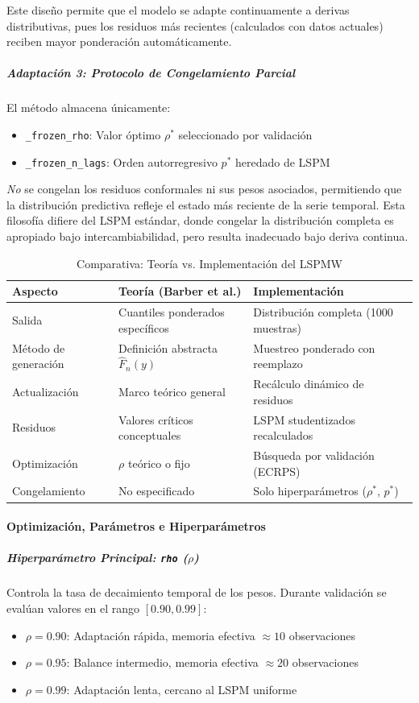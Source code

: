 Este diseño permite que el modelo se adapte continuamente a derivas distributivas, pues los residuos más recientes (calculados con datos actuales) reciben mayor ponderación automáticamente.

\subparagraph{Adaptación 3: Protocolo de Congelamiento Parcial}
El método almacena únicamente:
\begin{itemize}
    \item \texttt{\_frozen\_rho}: Valor óptimo $\rho^*$ seleccionado por validación
    \item \texttt{\_frozen\_n\_lags}: Orden autorregresivo $p^*$ heredado de LSPM
\end{itemize}

\textit{No} se congelan los residuos conformales ni sus pesos asociados, permitiendo que la distribución predictiva refleje el estado más reciente de la serie temporal. Esta filosofía difiere del LSPM estándar, donde congelar la distribución completa es apropiado bajo intercambiabilidad, pero resulta inadecuado bajo deriva continua.

\begin{table}[htbp]
\centering
\caption{Comparativa: Teoría vs. Implementación del LSPMW}
\begin{tabular}{lll}
\toprule
\textbf{Aspecto} & \textbf{Teoría (Barber et al.)} & \textbf{Implementación} \\
\midrule
Salida & Cuantiles ponderados específicos & Distribución completa (1000 muestras) \\
Método de generación & Definición abstracta $\hat{F}_n(y)$ & Muestreo ponderado con reemplazo \\
Actualización & Marco teórico general & Recálculo dinámico de residuos \\
Residuos & Valores críticos conceptuales & LSPM studentizados recalculados \\
Optimización & $\rho$ teórico o fijo & Búsqueda por validación (ECRPS) \\
Congelamiento & No especificado & Solo hiperparámetros ($\rho^*$, $p^*$) \\
\bottomrule
\end{tabular}
\end{table}

\paragraph{Optimización, Parámetros e Hiperparámetros}

\subparagraph{Hiperparámetro Principal: \texttt{rho} ($\rho$)}
Controla la tasa de decaimiento temporal de los pesos. Durante validación se evalúan valores en el rango $[0.90, 0.99]$:
\begin{itemize}
    \item $\rho = 0.90$: Adaptación rápida, memoria efectiva $\approx 10$ observaciones
    \item $\rho = 0.95$: Balance intermedio, memoria efectiva $\approx 20$ observaciones  
    \item $\rho = 0.99$: Adaptación lenta, cercano al LSPM uniforme
\end{itemize}

